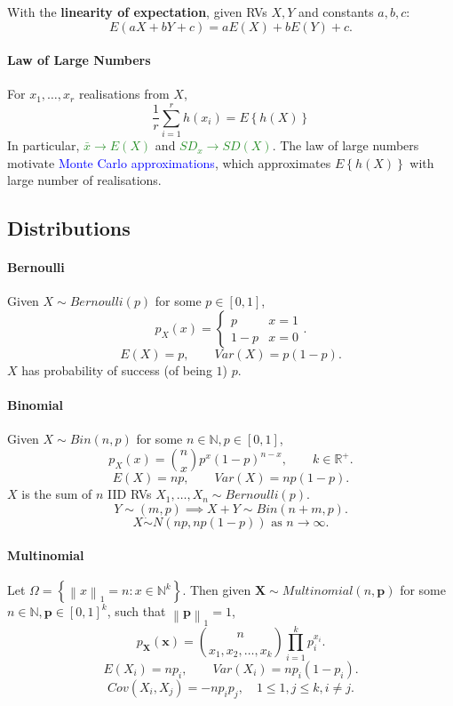 With the \textbf{linearity of expectation}, given RVs $X,Y$ and constants $a,b,c$:
 \[E(aX+bY+c)=aE(X)+bE(Y)+c.\] 
 \paragraph{Law of Large Numbers}
 For $x_1,\ldots,x_r$ realisations from $X$, 
 \[\frac{1}{r}\sum_{i=1}^{r} h(x_i)=E \left\{ h(X) \right\}\]
 In particular, \textcolor{ForestGreen}{$\bar{x}\to E(X)$} and
 \textcolor{ForestGreen}{$SD_x\to SD(X)$}.
The law of large numbers motivate \textcolor{Blue}{Monte Carlo approximations},
which approximates $E \left\{ h(X) \right\}$ with large number of realisations.


\subsection{Distributions}
\paragraph{Bernoulli}
Given $X\sim Bernoulli(p)$ for some $p\in [0,1]$,
\[p_X(x)=\begin{cases}p&x=1\\1-p&x=0\end{cases}.\]
\[E(X)=p,\qquad Var(X)=p(1-p).\] 
$X$ has probability of success (of being $1$) $p$.

\paragraph{Binomial}
Given $X\sim Bin(n, p)$ for some $n\in \mathbb{N},p\in [0,1]$,
\[p_X(x)=\binom{n}{x}p^{x}{\left( 1-p \right) }^{n-x},\qquad k\in \mathbb{R}^{+}.\] 
\[E(X)=np,\qquad Var(X)=np(1-p).\]
$X$ is the sum of $n$ IID RVs $X_1,\ldots,X_{n}\sim Bernoulli(p)$.
\[Y\sim(m,p)\implies X+Y\sim Bin(n+m,p).\]
\[X\dot\sim N(np, np(1-p))\text{ as }n\to \infty.\]

\paragraph{Multinomial}
Let $\Omega=\left\{ \left\lVert x \right\rVert_1=n : x\in \mathbb{N}^{k}
\right\}$. Then given $\mathbf{X}\sim Multinomial(n,\mathbf{p})$ for some $n\in
\mathbb{N},\mathbf{p}\in [0,1]^{k}$, such that $\left\lVert \mathbf{p}
\right\rVert_1 =1$,
\[p_\mathbf{X}(\mathbf{x})=\binom{n}{x_1,x_2,\ldots,x_k}\prod_{i=1}^{k} p_i^{x_i}.\] 
\[E(X_i)=np_i,\qquad Var(X_i)=np_i(1-p_i).\] 
\[Cov(X_i,X_j)=-np_ip_j,\quad 1\le 1,j\le k,i\neq j.\] 

